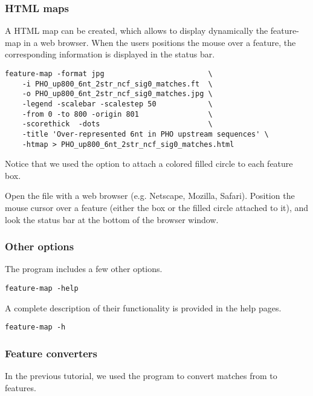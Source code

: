 \subsubsection{HTML maps}

A HTML map can be created, which allows to display dynamically the
feature-map in a web browser. When the users positions the mouse over
a feature, the corresponding information is displayed in the status
bar.

\begin{verbatim}
feature-map -format jpg                        \
    -i PHO_up800_6nt_2str_ncf_sig0_matches.ft  \
    -o PHO_up800_6nt_2str_ncf_sig0_matches.jpg \
    -legend -scalebar -scalestep 50            \
    -from 0 -to 800 -origin 801                \
    -scorethick  -dots                         \
    -title 'Over-represented 6nt in PHO upstream sequences' \
    -htmap > PHO_up800_6nt_2str_ncf_sig0_matches.html
\end{verbatim}

Notice that we used the option \option{-dot} to attach a colored filled 
circle to each feature box. 

Open the file 
with a web browser (e.g. Netscape, Mozilla, Safari). Position the
mouse cursor over a feature (either the box or the filled circle
attached to it), and look the status bar at the bottom of the browser
window.

\subsubsection{Other options}

The program \program{feature-map} includes a few other options.

\begin{verbatim}
feature-map -help
\end{verbatim}

A complete description of their functionality is provided in 
the help pages.

\begin{verbatim}
feature-map -h
\end{verbatim}

\subsubsection{Feature converters}

In the previous tutorial, we used the program
 to convert matches from
 to features. 

